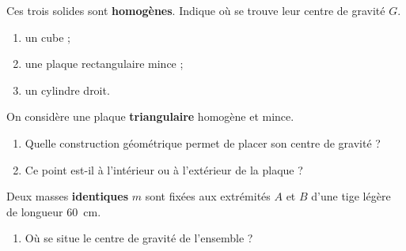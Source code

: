 \documentclass[11pt,a4paper]{article}
\begin{document}
\begin{exo}
Ces trois solides sont \textbf{homogènes}. Indique où se trouve leur centre de gravité $G$.
\begin{enumerate}[label=\alph*)]
  \item un cube ;
  \item une plaque rectangulaire mince ;
  \item un cylindre droit.
\end{enumerate}
\end{exo}

\begin{exo}[le triangle]
On considère une plaque \textbf{triangulaire} homogène et mince.
\begin{center}
\end{center}
\begin{enumerate}[label=\alph*)]
  \item Quelle construction géométrique permet de placer son centre de gravité ?
  \item Ce point est-il à l'intérieur ou à l'extérieur de la plaque ?
\end{enumerate}
\end{exo}

\begin{exo}
Deux masses \textbf{identiques} $m$ sont fixées aux extrémités $A$ et $B$ d'une tige légère de
longueur \qty{60}{cm}.
\begin{center}
\end{center}
\begin{enumerate}[label=\alph*)]
  \item Où se situe le centre de gravité de l'ensemble ?
\end{enumerate}
\end{exo}
\end{document}

